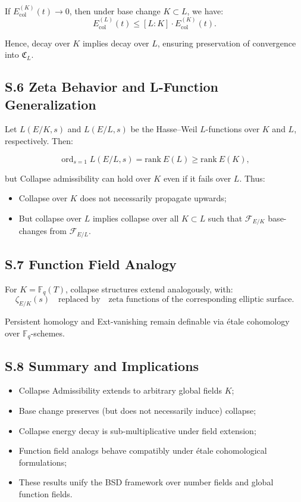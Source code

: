 \documentclass[11pt]{article}
\newcommand{\ord}{\operatorname{ord}}
\begin{document}
If \( E_{\mathrm{col}}^{(K)}(t) \to 0 \), then under base change \( K \subset L \), we have:
\[
E_{\mathrm{col}}^{(L)}(t) \leq [L:K] \cdot E_{\mathrm{col}}^{(K)}(t).
\]

Hence, decay over \( K \) implies decay over \( L \), ensuring preservation of convergence into \( \mathfrak{C}_L \).

\subsection*{S.6 Zeta Behavior and L-Function Generalization}

Let \( L(E/K, s) \) and \( L(E/L, s) \) be the Hasse–Weil \( L \)-functions over \( K \) and \( L \), respectively. Then:

\[
\ord_{s=1} L(E/L, s) = \mathrm{rank}~E(L) \geq \mathrm{rank}~E(K),
\]

but Collapse admissibility can hold over \( K \) even if it fails over \( L \). Thus:

\begin{itemize}
  \item Collapse over \( K \) does not necessarily propagate upwards;
  \item But collapse over \( L \) implies collapse over all \( K \subset L \) such that \( \mathcal{F}_{E/K} \) base-changes from \( \mathcal{F}_{E/L} \).
\end{itemize}

\subsection*{S.7 Function Field Analogy}

For \( K = \mathbb{F}_q(T) \), collapse structures extend analogously, with:
\[
\zeta_{E/K}(s) \quad \text{replaced by} \quad \text{zeta functions of the corresponding elliptic surface}.
\]

Persistent homology and Ext-vanishing remain definable via étale cohomology over \( \mathbb{F}_q \)-schemes.

\subsection*{S.8 Summary and Implications}

\begin{itemize}
  \item Collapse Admissibility extends to arbitrary global fields \( K \);
  \item Base change preserves (but does not necessarily induce) collapse;
  \item Collapse energy decay is sub-multiplicative under field extension;
  \item Function field analogs behave compatibly under étale cohomological formulations;
  \item These results unify the BSD framework over number fields and global function fields.
\end{itemize}
\end{document}
